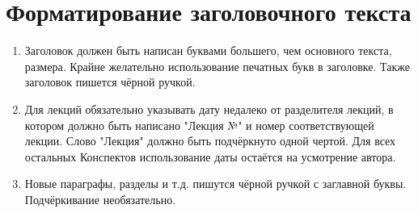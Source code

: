 \documentclass[a4paper]{article}
\theoremstyle{plain}
\theoremstyle{definition}
\theoremstyle{remark}
\begin{document}
    \section{Форматирование заголовочного текста}
    \begin{enumerate}
        \item Заголовок должен быть написан буквами большего, чем основного текста, размера. Крайне желательно использование печатных букв в заголовке. Также заголовок пишется чёрной ручкой.
        \item Для лекций обязательно указывать дату недалеко от разделителя лекций, в котором должно быть написано "Лекция №" и номер соответствующей лекции. Слово "Лекция" должно быть подчёркнуто одной чертой. Для всех остальных Конспектов использование даты остаётся на усмотрение автора.
        \item Новые параграфы, разделы и т.д. пишутся чёрной ручкой с заглавной буквы. Подчёркивание необязательно.
    \end{enumerate}

    
\end{document}

